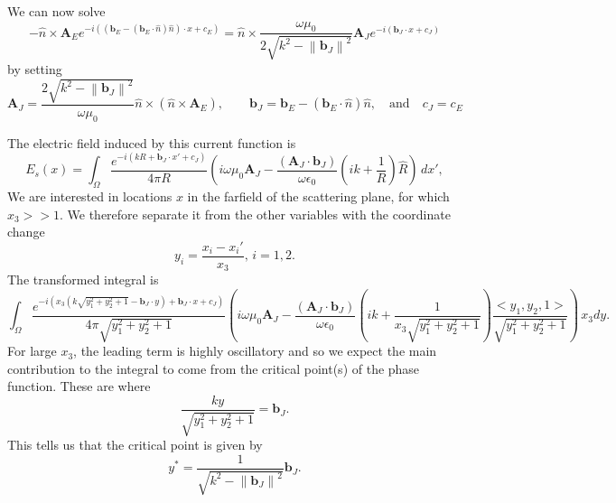 \documentclass{article}
\newcommand{\norm}[1]{\left\lVert #1 \right\rVert}
\theoremstyle{plain}
\begin{document}
We can now solve
\begin{equation}
	-\hat{n}\times\mathbf{A}_E e^{-i\left( \left(\mathbf{b}_E - (\mathbf{b}_E\cdot\hat{n})\hat{n}\right)\cdot x + c_E \right)}
	= \hat{n}\times\frac{\omega\mu_0}{2\sqrt{k^2 - \norm{\mathbf{b}_J}^2}} \mathbf{A}_J e^{-i(\mathbf{b}_J\cdot x + c_J)}
\end{equation}
by setting
\begin{equation}
	\mathbf{A}_J = \frac{2\sqrt{k^2 - \norm{\mathbf{b}_J}^2}}{\omega\mu_0} \hat{n}\times( \hat{n}\times\mathbf{A}_E ),
	\quad\quad \mathbf{b}_J = \mathbf{b}_E - (\mathbf{b}_E\cdot\hat{n})\hat{n},
	\quad\text{and}\quad c_J = c_E
\end{equation}

The electric field induced by this current function is 
\begin{equation}
	E_s(x)
	= \int_\Omega \frac{e^{-i(kR+\mathbf{b}_J\cdot x' + c_J)}}{4\pi R}
	\left( i\omega\mu_0 \mathbf{A}_J
	- \frac{(\mathbf{A}_J\cdot\mathbf{b}_J)}{\omega\epsilon_0}\left( ik + \frac{1}{R} \right) \hat{R} \right) \,dx',
\end{equation}
We are interested in locations $x$ in the farfield of the scattering plane, for which $x_3 >> 1$.
We therefore separate it from the other variables with the coordinate change
\begin{equation}
	y_i = \frac{x_i-x_i'}{x_3}, \, i=1,2.
\end{equation}
The transformed integral is
\begin{equation}
	\int_\Omega \frac{ e^{-i\left(x_3\left(k\sqrt{ y_1^2 + y_2^2 + 1 }-\mathbf{b}_J\cdot y\right) + \mathbf{b}_J\cdot x + c_J \right)} }{4\pi \sqrt{ y_1^2 + y_2^2 + 1 }}
	\left( i\omega\mu_0 \mathbf{A}_J
	- \frac{(\mathbf{A}_J\cdot\mathbf{b}_J)}{\omega\epsilon_0}
	\left( ik + \frac{1}{ x_3\sqrt{ y_1^2 + y_2^2 + 1 } } \right)
	\frac{<y_1,y_2,1>}{\sqrt{ y_1^2 + y_2^2 + 1 }} \right) \,x_3 dy.
\end{equation}
For large $x_3$, the leading term is highly oscillatory
and so we expect the main contribution to the integral to come from the critical point(s) of the phase function.
These are where
\begin{equation}
	\frac{ky}{\sqrt{ y_1^2 + y_2^2 + 1 }} = \mathbf{b}_J.
\end{equation}
This tells us that the critical point is given by
\begin{equation}
	y^* = \frac{1}{\sqrt{ k^2 - \norm{\mathbf{b}_J}^2 }}\mathbf{b}_J.
\end{equation}
\end{document}

